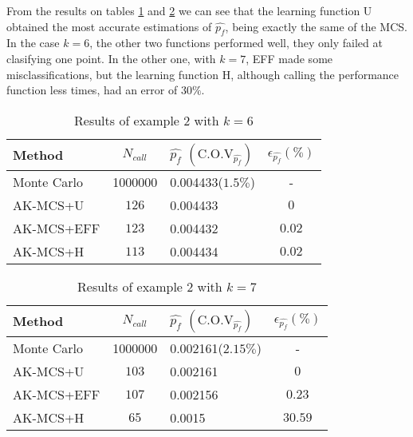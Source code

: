 From the results on tables \ref{tab:res_ex2} and \ref{tab:res_ex2_2} we can see
that the learning function U obtained the most accurate estimations of $\widehat{p_f}$,
being exactly the same of the MCS. In the case $k=6$, the other two functions performed
well, they only failed at clasifying one point. In the other one, with $k=7$, EFF made some
misclassifications, but the learning function H, although calling the performance function
less times, had an error of $30\%$. \\

\begin{table}[h]
    \footnotesize
    \begin{center}
    \begin{tabular}{lclc}
    \toprule
    Method & $N_{call}$  & $\widehat{p_f}$ $(\text{C.O.V}_{\widehat{p_f}})$ &$\epsilon_{\widehat{p_f}}(\%)$  \\
    \midrule
    Monte Carlo   & \num[round-precision=1,round-mode=figures]{1000000} & \num{0.004433}($1.5\%$) & - \\
    AK-MCS+U & $126$ & \num{0.004433} & $0$ \\
    AK-MCS+EFF & $123$ & \num{0.004432} & $0.02$ \\
    AK-MCS+H & $113$ & \num{0.004434} & $0.02$ \\
    \bottomrule
    \end{tabular}
    \end{center}
    \caption{Results of example 2 with $k=6$}
    \label{tab:res_ex2}
\end{table}

\begin{table}[h]
    \footnotesize
    \begin{center}
    \begin{tabular}{lclc}
    \toprule
    Method & $N_{call}$  & $\widehat{p_f}$ $(\text{C.O.V}_{\widehat{p_f}})$ &$\epsilon_{\widehat{p_f}}(\%)$  \\
    \midrule
    Monte Carlo   & \num[round-precision=1,round-mode=figures]{1000000} & \num{0.002161}($2.15\%$) & - \\
    AK-MCS+U & $103$ & \num{0.002161} & $0$ \\
    AK-MCS+EFF & $107$ & \num{0.002156} & $0.23$ \\
    AK-MCS+H & $65$ & \num{0.0015} & $30.59$ \\
    \bottomrule
    \end{tabular}
    \end{center}
    \caption{Results of example 2 with $k=7$}
    \label{tab:res_ex2_2}
\end{table}

